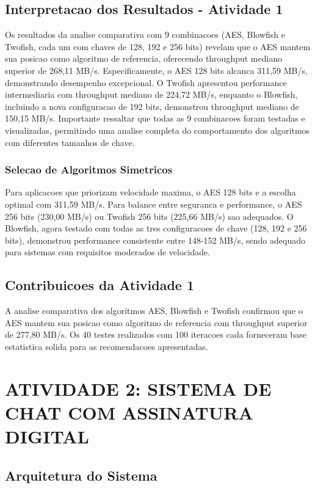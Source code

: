 \documentclass[12pt,a4paper,oneside]{article}
\begin{document}
\subsection{Interpretacao dos Resultados - Atividade 1}

Os resultados da analise comparativa com 9 combinacoes (AES, Blowfish e Twofish, cada um com chaves de 128, 192 e 256 bits) revelam que o AES mantem sua posicao como algoritmo de referencia, oferecendo throughput mediano superior de 268,11 MB/s. Especificamente, o AES 128 bits alcanca 311,59 MB/s, demonstrando desempenho excepcional. O Twofish apresentou performance intermediaria com throughput mediano de 224,72 MB/s, enquanto o Blowfish, incluindo a nova configuracao de 192 bits, demonstrou throughput mediano de 150,15 MB/s. Importante ressaltar que todas as 9 combinacoes foram testadas e visualizadas, permitindo uma analise completa do comportamento dos algoritmos com diferentes tamanhos de chave.

\subsubsection{Selecao de Algoritmos Simetricos}

Para aplicacoes que priorizam velocidade maxima, o AES 128 bits e a escolha optimal com 311,59 MB/s. Para balance entre seguranca e performance, o AES 256 bits (230,00 MB/s) ou Twofish 256 bits (225,66 MB/s) sao adequados. O Blowfish, agora testado com todas as tres configuracoes de chave (128, 192 e 256 bits), demonstrou performance consistente entre 148-152 MB/s, sendo adequado para sistemas com requisitos moderados de velocidade.

\subsection{Contribuicoes da Atividade 1}

A analise comparativa dos algoritmos AES, Blowfish e Twofish confirmou que o AES mantem sua posicao como algoritmo de referencia com throughput superior de 277,80 MB/s. Os 40 testes realizados com 100 iteracoes cada forneceram base estatistica solida para as recomendacoes apresentadas.

\section{ATIVIDADE 2: SISTEMA DE CHAT COM ASSINATURA DIGITAL}

\subsection{Arquitetura do Sistema}
\end{document}
